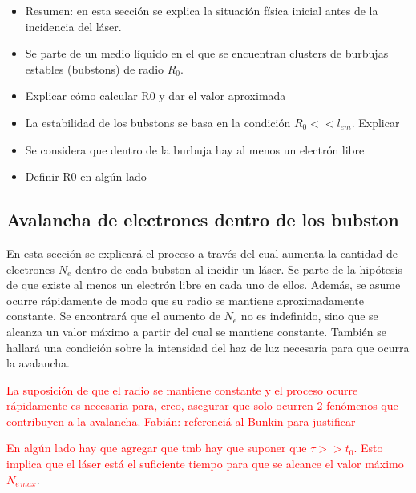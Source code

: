 \documentclass[aps,prb,onecolumn,superscriptaddress,floatfix,longbibliography,10pt]{revtex4-2}
\newif\ifptitle
\newif\ifpnumber
\newcounter{para}
\newcommand\ptitle[1]{\par\refstepcounter{para}
{\ifpnumber{\noindent\textcolor{lightgray}{\textbf{\thepara}}\indent}\fi}
{\ifptitle{\textbf{[{#1}]}}\fi}}
\begin{document}
\ptitle{Situación física inicial}
\begin{itemize}
  \item Resumen: en esta sección se explica la situación física inicial antes de la incidencia del láser.
  \item Se parte de un medio líquido en el que se encuentran clusters de burbujas estables (bubstons) de radio $R_0$.
  \item Explicar cómo calcular R0 y dar el valor aproximada
  \item La estabilidad de los bubstons se basa en la condición $R_0 << l_{em}$. Explicar
  \item Se considera que dentro de la burbuja hay al menos un electrón libre
  \item Definir R0 en algún lado
\end{itemize}



\subsection{Avalancha de electrones dentro de los bubston}

En esta sección se explicará el proceso a través del cual aumenta la cantidad de electrones $N_e$ dentro de cada bubston al incidir un láser. Se parte de la hipótesis de que existe al menos un electrón libre en cada uno de ellos. Además, se asume ocurre rápidamente de modo que su radio se mantiene aproximadamente constante. Se encontrará que el aumento de $N_e$ no es indefinido, sino que se alcanza un valor máximo a partir del cual se mantiene constante. También se hallará una condición sobre la intensidad del haz de luz necesaria para que ocurra la avalancha.

\textcolor{red}{La suposición de que el radio se mantiene constante y el proceso ocurre rápidamente es necesaria para, creo, asegurar que solo ocurren 2 fenómenos que contribuyen a la avalancha. Fabián: referenciá al Bunkin para justificar}

\textcolor{red}{En algún lado hay que agregar que tmb hay que suponer que $\tau >> t_0$. Esto implica que el láser está el suficiente tiempo para que se alcance el valor máximo $N_{e \, max}$}.

\ptitle{La avalancha comienza con un electrón dentro de la burbuja inmerso en el campo electromagnético producido por el láser}
\end{document}

